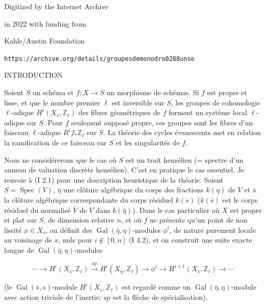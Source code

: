 \begin{center}
Digitized by the Internet Archive

in 2022 with funding from

Kahle/Austin Foundation

\bigskip
\texttt{https://archive.org/details/groupesdemonodro0288unse}
\end{center}
\clearpage

\begin{center}
INTRODUCTION
\end{center}

Soient $S$ un schéma et $f:X\longrightarrow S$ un morphisme de schémas. Si $f$ est
propre et lisse, et que le nombre premier $\ell$ est inversible sur $S$, les groupes de
cohomologie $\ell$-adique $H^i(X_{\bar s},\mathbb Z_\ell)$ des fibres géométriques de $f$ forment un système
local $\ell$-adique sur $S$. Pour $f$ seulement supposé propre, ces groupes sont les fibres
d'un faisceau $\ell$-adique $R^i f_*\mathbb Z_\ell$ sur $S$. La théorie des cycles évanescents met
en relation la ramification de ce faisceau sur $S$ et les singularités de $f$.

Nous ne considérerons que le cas où $S$ est un trait hensélien (= spectre d'un
anneau de valuation discrète hensélien). C'est en pratique le cas essentiel. Je renvoie
à (I 2.1) pour une description heuristique de la théorie. Soient $S=\operatorname{Spec}(V)$, $\bar\eta$
une clôture algébrique du corps des fractions $k(\eta)$ de $V$ et $\bar s$ la clôture algébrique
correspondante du corps résiduel $k(s)$ ($k(\bar s)$ est le corps résiduel du normalisé
$\bar V$ de $V$ dans $k(\bar\eta)$). Dans le cas particulier où $X$ est propre et plat sur
$S$, de dimension relative $n$, et où $f$ ne présente qu'un point de non lissité
$x\in X_s$, on définit des $\operatorname{Gal}(\bar\eta,\eta)$-modules $\phi^i$, de nature purement locale au voisinage
de $x$, nuls pour $i\notin[0,n]$ (I 4.2), et on construit une suite exacte longue
de $\operatorname{Gal}(\bar\eta,\eta)$-modules

\[
\cdots \longrightarrow H^i(X_{\bar s},\mathbb Z_\ell)
\xrightarrow{\mathrm{sp}} H^i(X_{\bar\eta},\mathbb Z_\ell)
\longrightarrow \phi^i
\longrightarrow H^{i+1}(X_{\bar s},\mathbb Z_\ell)
\longrightarrow \cdots
\]

(le $\operatorname{Gal}(\bar s,s)$-module $H^i(X_{\bar s},\mathbb Z_\ell)$ est regardé comme un
$\operatorname{Gal}(\bar\eta,\eta)$-module avec action triviale de l'inertie; $\mathrm{sp}$ est la flèche de spécialisation).

